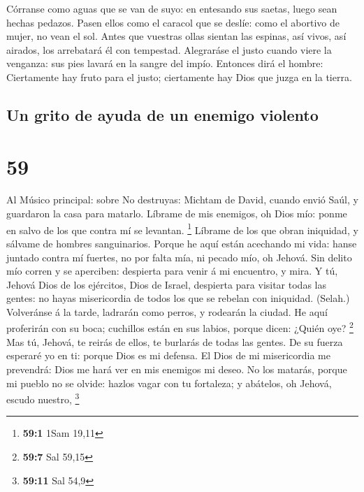  Córranse como aguas que se van de suyo: en entesando sus
saetas, luego sean hechas pedazos.  Pasen ellos como el
caracol que se deslíe: como el abortivo de mujer, no vean el sol.
 Antes que vuestras ollas sientan las espinas, así vivos,
así airados, los arrebatará él con tempestad.  Alegraráse
el justo cuando viere la venganza: sus pies lavará en la sangre del
impío.  Entonces dirá el hombre: Ciertamente hay fruto para
el justo; ciertamente hay Dios que juzga en la tierra.

\hypertarget{un-grito-de-ayuda-de-un-enemigo-violento}{%
\subsection{Un grito de ayuda de un enemigo
violento}\label{un-grito-de-ayuda-de-un-enemigo-violento}}

\hypertarget{section-58}{%
\section{59}\label{section-58}}

 Al Músico principal: sobre No destruyas: Michtam de David,
cuando envió Saúl, y guardaron la casa para matarlo. Líbrame de mis
enemigos, oh Dios mío: ponme en salvo de los que contra mí se levantan.
\footnote{\textbf{59:1} 1Sam 19,11}  Líbrame de los que
obran iniquidad, y sálvame de hombres sanguinarios.  Porque
he aquí están acechando mi vida: hanse juntado contra mí fuertes, no por
falta mía, ni pecado mío, oh Jehová.  Sin delito mío corren
y se aperciben: despierta para venir á mi encuentro, y mira.
 Y tú, Jehová Dios de los ejércitos, Dios de Israel,
despierta para visitar todas las gentes: no hayas misericordia de todos
los que se rebelan con iniquidad. (Selah.)  Volveránse á la
tarde, ladrarán como perros, y rodearán la ciudad.  He aquí
proferirán con su boca; cuchillos están en sus labios, porque dicen:
¿Quién oye? \footnote{\textbf{59:7} Sal 59,15}  Mas tú,
Jehová, te reirás de ellos, te burlarás de todas las gentes.
 De su fuerza esperaré yo en ti: porque Dios es mi defensa.
 El Dios de mi misericordia me prevendrá: Dios me hará ver
en mis enemigos mi deseo.  No los matarás, porque mi pueblo
no se olvide: hazlos vagar con tu fortaleza; y abátelos, oh Jehová,
escudo nuestro, \footnote{\textbf{59:11} Sal 54,9}

